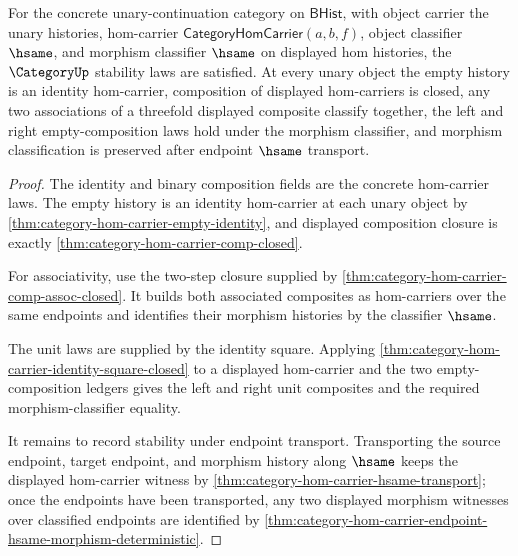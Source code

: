 \begin{theorem}
\label{thm:category-unary-continuation-stability-law-package}
For the concrete unary-continuation category on $\mathsf{BHist}$, with object
carrier the unary histories, hom-carrier
$\mathsf{CategoryHomCarrier}(a,b,f)$, object classifier $\hsame$, and morphism
classifier $\hsame$ on displayed hom histories, the $\CategoryUp$ stability
laws are satisfied. At every unary object the empty history is an identity
hom-carrier, composition of displayed hom-carriers is closed, any two
associations of a threefold displayed composite classify together, the left and
right empty-composition laws hold under the morphism classifier, and morphism
classification is preserved after endpoint $\hsame$ transport.
\end{theorem}
\begin{proof}
The identity and binary composition fields are the concrete hom-carrier laws.
The empty history is an identity hom-carrier at each unary object by
\autoref{thm:category-hom-carrier-empty-identity}, and displayed composition
closure is exactly \autoref{thm:category-hom-carrier-comp-closed}.

For associativity, use the two-step closure supplied by
\autoref{thm:category-hom-carrier-comp-assoc-closed}. It builds both
associated composites as hom-carriers over the same endpoints and identifies
their morphism histories by the classifier $\hsame$.

The unit laws are supplied by the identity square. Applying
\autoref{thm:category-hom-carrier-identity-square-closed} to a displayed
hom-carrier and the two empty-composition ledgers gives the left and right
unit composites and the required morphism-classifier equality.

It remains to record stability under endpoint transport. Transporting the
source endpoint, target endpoint, and morphism history along $\hsame$ keeps the
displayed hom-carrier witness by
\autoref{thm:category-hom-carrier-hsame-transport}; once the endpoints have
been transported, any two displayed morphism witnesses over classified
endpoints are identified by
\autoref{thm:category-hom-carrier-endpoint-hsame-morphism-deterministic}.
\end{proof}

